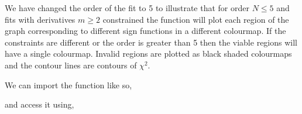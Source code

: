 \documentclass[letterpaper,10pt,english]{sphinxmanual}
\begin{document}
\begin{sphinxVerbatim}[commandchars=\\\{\}]
   

  
  

   

  
      
\end{sphinxVerbatim}

We have changed the order of the fit to 5 to illustrate that for
order \({N \leq 5}\) and fits with derivatives \({m \geq 2}\) constrained
the function will plot each region of the graph corresponding to
different sign functions in a different colourmap. If the constraints are
different or the order is greater than 5 then the viable regions will have
a single colourmap. Invalid regions are plotted as black shaded colourmaps
and the contour lines are contours of \({\chi^2}\).

We can import the function like so,

\begin{sphinxVerbatim}[commandchars=\\\{\}]
   
\end{sphinxVerbatim}

and access it using,

\begin{sphinxVerbatim}[commandchars=\\\{\}]
 
       
\end{sphinxVerbatim}
\end{document}
